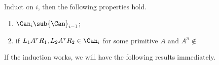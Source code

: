 \begin{theorem}
    Induct on $i$, then the following properties hold.
    \begin{enumerate}
        \item ${\Can}_{i}\sub{\Can}_{i-1}$;
        \item if ${L}_{1}{A}^{\tau}{R}_{1},{L}_{2}{A}^{\tau}{R}_{2}\in{\Can}_{i}$ for some primitive $A$ and ${A}^{n}\notin$
    \end{enumerate}
\end{theorem}




\par
If the induction works, we will have the following results immediately.
\begin{theorem}
    
\end{theorem}